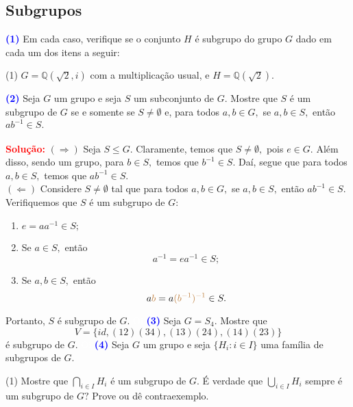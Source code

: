 \documentclass[12pt, a4paper]{article}
\newcommand{\negrito}[1]{\mbox{\boldmath{$#1$}}}
\begin{document}
\subsection{\textcolor{Floresta}{Subgrupos}}
\textcolor{blue}{\bf(1)}\label{9} Em cada caso, verifique se o conjunto $H$ é subgrupo do grupo $G$ dado em cada um dos itens a seguir:
\begin{tasks}[counter-format={(tsk[a])},label-width=3.6ex, label-format = {\bfseries}, column-sep = {0pt}](1)
\task[\textcolor{Floresta}{$\negrito{(a)} $}] $G = \mathbb{Q}(\sqrt{2}, i)$ com a multiplicação usual, e $H  = \mathbb{Q}(\sqrt{2}).$
\end{tasks}
\textcolor{blue}{\bf(2)}\label{10} Seja $G$ um grupo e seja $S$ um subconjunto de $G.$ Mostre que $S$ é um subgrupo de $G$ se e somente se $S \neq \emptyset$ e, para todos $a,b \in G,$ se $a,b \in S,$ então $ab^{-1} \in S.$ \\ \\
\textbf{\textcolor{red}{Solução:}} $(\Rightarrow )$ Seja $S \le G.$ Claramente, temos que $S \neq \emptyset,$ pois $e \in G.$ Além disso, sendo um grupo, para $b \in S,$ temos que $b^{-1} \in S.$ Daí, segue que para todos $a,b \in S,$ temos que $ab^{-1} \in S.$ \\
$(\Leftarrow )$ Considere $S \neq \emptyset$ tal que para todos $a,b \in G,$ se $a,b \in S,$ então $ab^{-1} \in S.$ Verifiquemos que $S$ é um subgrupo de $G:$
\begin{enumerate}
    \item $e = aa^{-1} \in S;$
    \item Se $a \in S,$ então \[a^{-1} = ea^{-1} \in S;\]
    \item Se $a,b \in S,$ então
    \[  a\textcolor{brown}{b} = a\textcolor{brown}{(b^{-1})^{-1}} \in S.\]
\end{enumerate}
Portanto, $S$ é subgrupo de $G.$
\textcolor{white}{Oi}\newline\newline
\textcolor{blue}{\bf(3)}\label{11} Seja $G = S_4.$ Mostre que 
\[
V = \{ id, (1 2)(3 4), (1 3)(2 4), (1 4)(2 3)\}
\]
é subgrupo de $G.$
\textcolor{white}{Oi}\newline\newline
\textcolor{blue}{\bf(4)}\label{12} Seja $G$ um grupo e seja $\{H_i : i \in I \}$ uma família de subgrupos de $G.$
\begin{tasks}[counter-format={(tsk[a])},label-width=3.6ex, label-format = {\bfseries}, column-sep = {0pt}](1)
\task[\textcolor{Floresta}{$\negrito{(a)} $}] Mostre que $\bigcap\limits_{i \in I} H_i$ é um subgrupo de $G.$
\task[\textcolor{Floresta}{$\negrito{(b)} $}] É verdade que $\bigcup\limits_{i \in I} H_i$ sempre é um subgrupo de $G?$ Prove ou dê contraexemplo.
\end{tasks}
\end{document}
